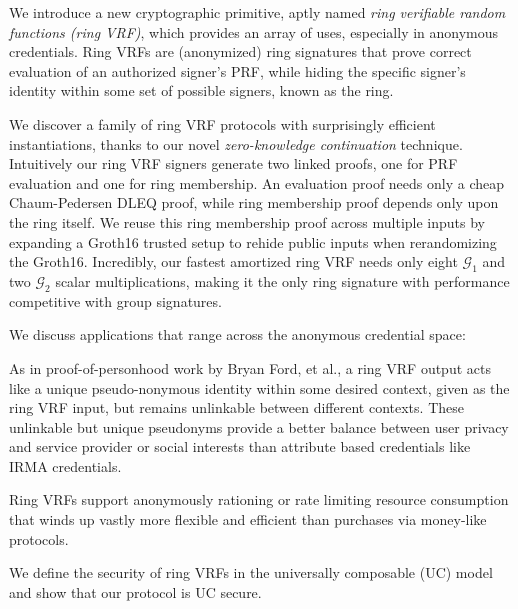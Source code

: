 
\def\eprintsmallskip{\smallskip}{}%
We introduce a new cryptographic primitive, aptly named
 \emph{ring verifiable random functions (ring VRF)},
 which provides an array of uses, especially in anonymous credentials.
Ring VRFs are (anonymized) ring signatures that prove correct evaluation
of an authorized signer's PRF, while hiding the specific signer's
identity within some set of possible signers, known as the ring.

We discover a family of ring VRF protocols with surprisingly efficient
instantiations, thanks to our novel {\em zero-knowledge continuation} technique.
%
Intuitively our ring VRF signers generate two linked proofs,
 one for PRF evaluation and one for ring membership. 
An evaluation proof needs only a cheap Chaum-Pedersen DLEQ proof,
while ring membership proof depends only upon the ring itself.
We reuse this ring membership proof across multiple inputs
by expanding a Groth16 trusted setup to rehide public inputs when
 rerandomizing the Groth16.
%
Incredibly, our fastest amortized ring VRF needs only eight $\mathcal{G}_1$
 and two $\mathcal{G}_2$ scalar multiplications, 
making it the only ring signature with performance competitive with group signatures.

\eprintsmallskip

We discuss applications that range across the anonymous credential space:

As in proof-of-personhood work by Bryan Ford, et al.,
a ring VRF output acts like a unique pseudo-nonymous identity
 within some desired context, given as the ring VRF input,
but remains unlinkable between different contexts. 
These unlinkable but unique pseudonyms provide a better balance
between user privacy and service provider or social interests than
 attribute based credentials like IRMA credentials.

\eprintsmallskip
Ring VRFs support anonymously rationing or rate limiting resource
consumption that winds up vastly more flexible and efficient than
purchases via money-like protocols.

\eprintsmallskip
We define the security of ring VRFs in the universally composable (UC) model and show that our protocol is UC secure.
